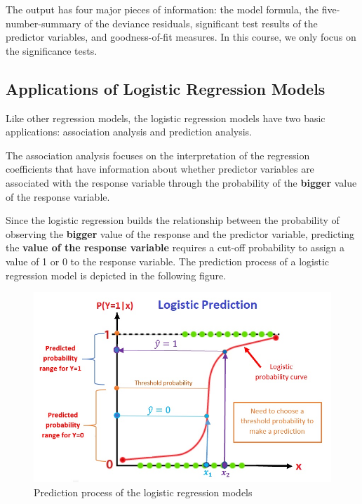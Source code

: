 \documentclass[
]{book}
\begin{document}
The output has four major pieces of information: the model formula, the five-number-summary of the deviance residuals, significant test results of the predictor variables, and goodness-of-fit measures. In this course, we only focus on the significance tests.

\hypertarget{applications-of-logistic-regression-models}{%
\subsection{Applications of Logistic Regression Models}\label{applications-of-logistic-regression-models}}

Like other regression models, the logistic regression models have two basic applications: association analysis and prediction analysis.

The association analysis focuses on the interpretation of the regression coefficients that have information about whether predictor variables are associated with the response variable through the probability of the \textbf{bigger} value of the response variable.

Since the logistic regression builds the relationship between the probability of observing the \textbf{bigger} value of the response and the predictor variable, predicting the \textbf{value of the response variable} requires a cut-off probability to assign a value of 1 or 0 to the response variable. The prediction process of a logistic regression model is depicted in the following figure.

\begin{figure}

{\centering \includegraphics[width=0.8\linewidth]{img11/w11-LogisticPrediction} 

}

\caption{Prediction process of the logistic regression models}\label{fig:unnamed-chunk-176}
\end{figure}
\end{document}
